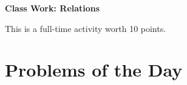 \documentclass[11pt]{article}
\begin{document}
	
	\thispagestyle{empty}
	\renewcommand{\headrulewidth}{0.0pt}
	\thispagestyle{fancy}
	\lfoot{}
	\cfoot{}
	\rfoot{}	
	
	\vspace*{0in}

		\begin{center}
			\begin{large}
			\textbf{Class Work: Relations} \\
			\end{large}
			This is a full-time activity worth 10 points. 
			
		\end{center}
		

\section*{Problems of the Day}
\end{document}
